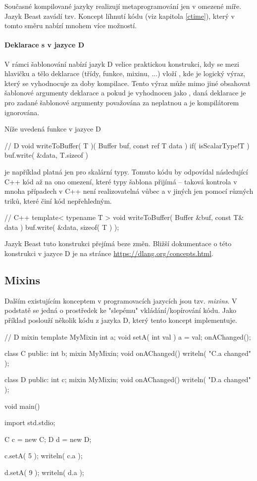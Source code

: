 Současné kompilované jazyky realizují metaprogramování jen v omezené míře. Jazyk Beast zavádí tzv. Koncept líhnutí kódu (viz kapitola \ref{ctime}), který v tomto směru nabízí mnohem více možností.

\paragraph{Deklarace s  v jazyce D}
V rámci šablonování nabízí jazyk D velice praktickou konstrukci, kdy se mezi hlavičku a tělo deklarace (třídy, funkce, mixinu, ...) vloží , kde  je logický výraz, který se vyhodnocuje za doby kompilace. Tento výraz může mimo jiné obsahovat šablonové argumenty deklarace a pokud je vyhodnocen jako , daná deklarace je pro zadané šablonové argumenty považována za neplatnou a je kompilátorem ignorována.

Níže uvedená funkce v jazyce D
\begin{dcode}
// D
void writeToBuffer( T )( Buffer buf, const ref T data )
	if( isScalarType!T )
{
	buf.write( &data, T.sizeof )
}
\end{dcode}
je například platná jen pro skalární typy. Tomuto kódu by odpovídal následující C++ kód až na ono omezení, které typy šablona přijímá -- taková kontrola v mnoha případech v C++ není realizovatelná vůbec a v jiných jen pomocí různých triků, které činí kód nepřehledným.

\begin{cppcode}
// C++
template< typename T >
void writeToBuffer( Buffer &buf, const T& data ) {
	buf.write( &data, sizeof( T ) );
}
\end{cppcode}

Jazyk Beast tuto konstrukci přejímá beze změn. Bližší dokumentace o této konstrukci v jazyce D je na stránce \url{https://dlang.org/concepts.html}.

\subsection{Mixins}
Dalším existujícím konceptem v programovacích jazycích jsou tzv. \textit{mixins}. V podstatě se jedná o prostředek ke "slepému" vkládání/kopírování kódu. Jako příklad poslouží několik kódu z jazyka D, který tento koncept implementuje.

\begin{dcode}
// D
mixin template MyMixin {
	int a;	
	void setA( int val ) {
		a = val;	
		onAChanged();
	}
}

class C {
public:
	int b;
	mixin MyMixin;
	void onAChanged() {
		writeln( "C.a changed" );	
	}
}

class D {
public:
	int c;
	mixin MyMixin;	
	void onAChanged() {
		writeln( "D.a changed" );	
	}
}

void main() {
	import std.stdio;
	
	C c = new C;
	D d = new D;
	
	c.setA( 5 );
	writeln( c.a );
	
	d.setA( 9 );
	writeln( d.a );
}
\end{dcode}

